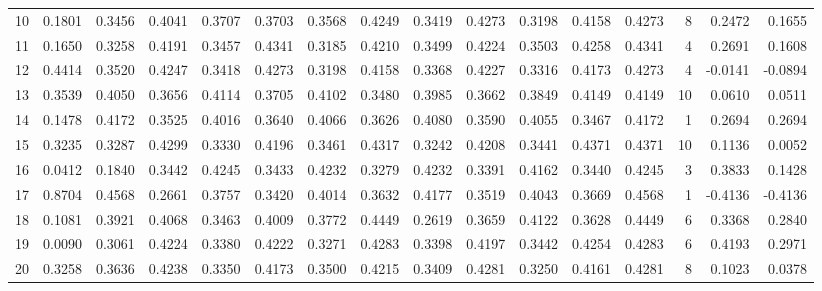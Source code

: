 \begin{tabular}{lrrrrrrrrrrrrrrr}
10  &      0.1801 &  0.3456 &  0.4041 &  0.3707 &  0.3703 &  0.3568 &  0.4249 &  0.3419 &  0.4273 &  0.3198 &   0.4158 &     0.4273 &      8 &                    0.2472 &                     0.1655 \\
11  &      0.1650 &  0.3258 &  0.4191 &  0.3457 &  0.4341 &  0.3185 &  0.4210 &  0.3499 &  0.4224 &  0.3503 &   0.4258 &     0.4341 &      4 &                    0.2691 &                     0.1608 \\
12  &      0.4414 &  0.3520 &  0.4247 &  0.3418 &  0.4273 &  0.3198 &  0.4158 &  0.3368 &  0.4227 &  0.3316 &   0.4173 &     0.4273 &      4 &                   -0.0141 &                    -0.0894 \\
13  &      0.3539 &  0.4050 &  0.3656 &  0.4114 &  0.3705 &  0.4102 &  0.3480 &  0.3985 &  0.3662 &  0.3849 &   0.4149 &     0.4149 &     10 &                    0.0610 &                     0.0511 \\
14  &      0.1478 &  0.4172 &  0.3525 &  0.4016 &  0.3640 &  0.4066 &  0.3626 &  0.4080 &  0.3590 &  0.4055 &   0.3467 &     0.4172 &      1 &                    0.2694 &                     0.2694 \\
15  &      0.3235 &  0.3287 &  0.4299 &  0.3330 &  0.4196 &  0.3461 &  0.4317 &  0.3242 &  0.4208 &  0.3441 &   0.4371 &     0.4371 &     10 &                    0.1136 &                     0.0052 \\
16  &      0.0412 &  0.1840 &  0.3442 &  0.4245 &  0.3433 &  0.4232 &  0.3279 &  0.4232 &  0.3391 &  0.4162 &   0.3440 &     0.4245 &      3 &                    0.3833 &                     0.1428 \\
17  &      0.8704 &  0.4568 &  0.2661 &  0.3757 &  0.3420 &  0.4014 &  0.3632 &  0.4177 &  0.3519 &  0.4043 &   0.3669 &     0.4568 &      1 &                   -0.4136 &                    -0.4136 \\
18  &      0.1081 &  0.3921 &  0.4068 &  0.3463 &  0.4009 &  0.3772 &  0.4449 &  0.2619 &  0.3659 &  0.4122 &   0.3628 &     0.4449 &      6 &                    0.3368 &                     0.2840 \\
19  &      0.0090 &  0.3061 &  0.4224 &  0.3380 &  0.4222 &  0.3271 &  0.4283 &  0.3398 &  0.4197 &  0.3442 &   0.4254 &     0.4283 &      6 &                    0.4193 &                     0.2971 \\
20  &      0.3258 &  0.3636 &  0.4238 &  0.3350 &  0.4173 &  0.3500 &  0.4215 &  0.3409 &  0.4281 &  0.3250 &   0.4161 &     0.4281 &      8 &                    0.1023 &                     0.0378 \\

\end{tabular}
